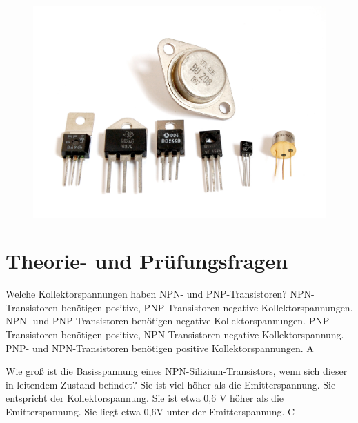 \begin{figure}
 \vspace{-6cm}
 \includegraphics[scale=0.3]{Transistor/Bilder/Transistors-white.jpg}
 \vspace{-6cm}
\end{figure}

\section*{Theorie- und Prüfungsfragen} 


{Welche Kollektorspannungen haben NPN- und PNP-Transistoren?}%
{NPN-Transistoren benötigen positive, PNP-Transistoren negative Kollektorspannungen.}%
{NPN- und PNP-Transistoren benötigen negative Kollektorspannungen.}%
{PNP-Transistoren benötigen positive, NPN-Transistoren negative Kollektorspannung.}%
{PNP- und NPN-Transistoren benötigen positive Kollektorspannungen.}%
{A}%

{Wie groß ist die Basisspannung eines NPN-Silizium-Transistors, wenn sich dieser in leitendem Zustand befindet?}%
{Sie ist viel höher als die Emitterspannung.}%
{Sie entspricht der Kollektorspannung.}%
{Sie ist etwa 0,6 V höher als die Emitterspannung.}%
{Sie liegt etwa 0,6V unter der Emitterspannung.}%
{C}%

